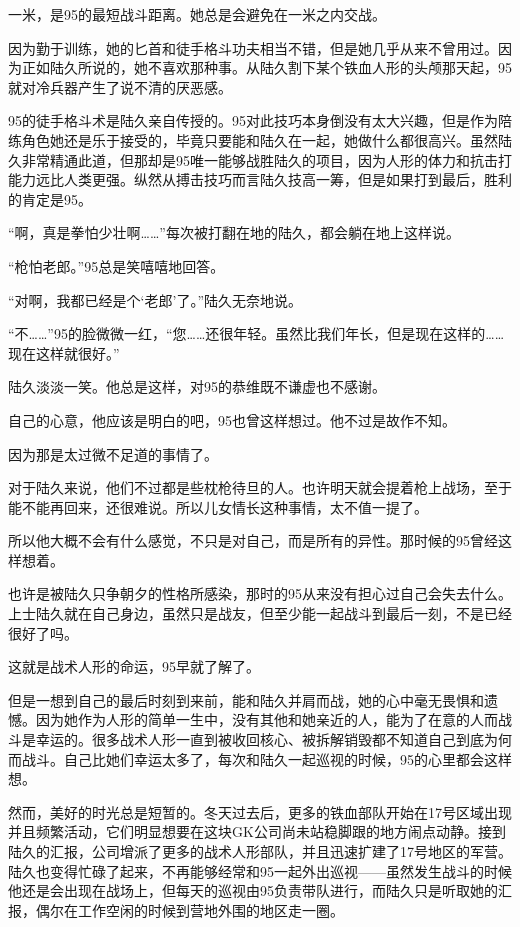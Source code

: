一米，是95的最短战斗距离。她总是会避免在一米之内交战。

因为勤于训练，她的匕首和徒手格斗功夫相当不错，但是她几乎从来不曾用过。因为正如陆久所说的，她不喜欢那种事。从陆久割下某个铁血人形的头颅那天起，95就对冷兵器产生了说不清的厌恶感。

95的徒手格斗术是陆久亲自传授的。95对此技巧本身倒没有太大兴趣，但是作为陪练角色她还是乐于接受的，毕竟只要能和陆久在一起，她做什么都很高兴。虽然陆久非常精通此道，但那却是95唯一能够战胜陆久的项目，因为人形的体力和抗击打能力远比人类更强。纵然从搏击技巧而言陆久技高一筹，但是如果打到最后，胜利的肯定是95。

“啊，真是拳怕少壮啊……”每次被打翻在地的陆久，都会躺在地上这样说。

“枪怕老郎。”95总是笑嘻嘻地回答。

“对啊，我都已经是个‘老郎’了。”陆久无奈地说。

“不……”95的脸微微一红，“您……还很年轻。虽然比我们年长，但是现在这样的……现在这样就很好。”

陆久淡淡一笑。他总是这样，对95的恭维既不谦虚也不感谢。

自己的心意，他应该是明白的吧，95也曾这样想过。他不过是故作不知。

因为那是太过微不足道的事情了。

对于陆久来说，他们不过都是些枕枪待旦的人。也许明天就会提着枪上战场，至于能不能再回来，还很难说。所以儿女情长这种事情，太不值一提了。

所以他大概不会有什么感觉，不只是对自己，而是所有的异性。那时候的95曾经这样想着。

也许是被陆久只争朝夕的性格所感染，那时的95从来没有担心过自己会失去什么。上士陆久就在自己身边，虽然只是战友，但至少能一起战斗到最后一刻，不是已经很好了吗。

这就是战术人形的命运，95早就了解了。

但是一想到自己的最后时刻到来前，能和陆久并肩而战，她的心中毫无畏惧和遗憾。因为她作为人形的简单一生中，没有其他和她亲近的人，能为了在意的人而战斗是幸运的。很多战术人形一直到被收回核心、被拆解销毁都不知道自己到底为何而战斗。自己比她们幸运太多了，每次和陆久一起巡视的时候，95的心里都会这样想。

然而，美好的时光总是短暂的。冬天过去后，更多的铁血部队开始在17号区域出现并且频繁活动，它们明显想要在这块GK公司尚未站稳脚跟的地方闹点动静。接到陆久的汇报，公司增派了更多的战术人形部队，并且迅速扩建了17号地区的军营。陆久也变得忙碌了起来，不再能够经常和95一起外出巡视——虽然发生战斗的时候他还是会出现在战场上，但每天的巡视由95负责带队进行，而陆久只是听取她的汇报，偶尔在工作空闲的时候到营地外围的地区走一圈。

